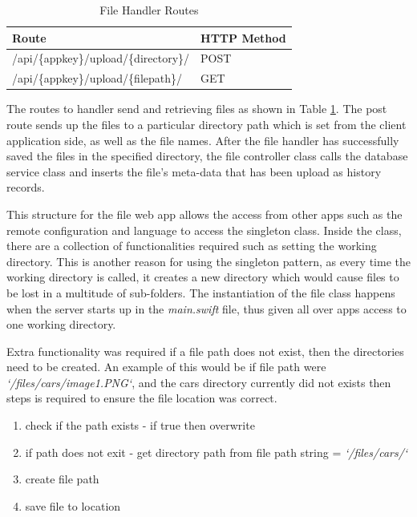 \begin{table}[!h]
\centering
\caption{File Handler Routes}
\label{tb:file-routes}
\begin{tabular}{|l|l|}
\hline
\rowcolor{green!20}
Route                                        & HTTP Method \\ \hline
/api/\{appkey\}/upload/\{directory\}/          & POST        \\ \hline
/api/\{appkey\}/upload/\{filepath\}/ & GET         \\ \hline
\end{tabular}
\end{table}


The routes to handler send and retrieving files as shown in Table \ref{tb:file-routes}. The post route sends up the files to a particular directory path which is set from the client application side, as well as the file names. After the file handler has successfully saved the files in the specified directory, the file controller class calls the database service class and inserts the file's meta-data that has been upload as history records.

This structure for the file web app allows the access from other apps such as the remote configuration and language to access the singleton class. Inside the class, there are a collection of functionalities required such as setting the working directory. This is another reason for using the singleton pattern, as every time the working directory is called, it creates a new directory which would cause files to be lost in a multitude of sub-folders. The instantiation of the file class happens when the server starts up in the \textit{main.swift} file, thus given all over apps access to one working directory.

Extra functionality was required if a file path does not exist, then the directories need to be created. An example of this would be if file path were \textit{`/files/cars/image1.PNG`}, and the cars directory currently did not exists then steps is required to ensure the file location was correct.

\begin{enumerate}
  \item check if the path exists
  - if true then overwrite 
  \item if path does not exit
  - get directory path from file path string = \textit{`/files/cars/`}
  \item create file path
  \item save file to location
\end{enumerate}


